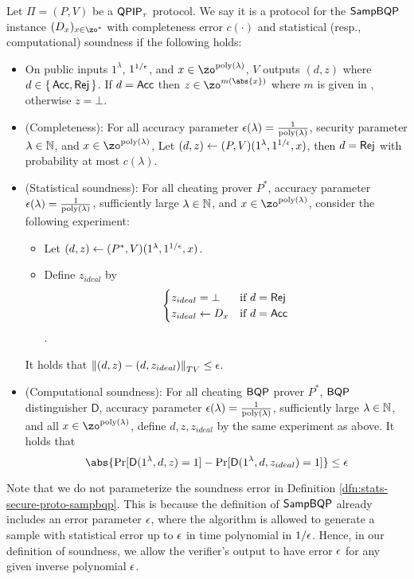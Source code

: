\begin{definition}
	\label{dfn:stats-secure-proto-sampbqp}
	Let $\Pi=(P, V)$ be a $\operatorname{\mathsf{QPIP}}_\tau$ protocol.
	We say it is a protocol for the $\operatorname{\mathsf{SampBQP}}$ instance $(D_x)_{x\in\zo^*}$ with completeness error $c(\cdot)$ and statistical (resp., computational) soundness if the following holds:
	\begin{itemize}
		\item On public inputs $1^\lambda$, $1^{1/\epsilon}$, and $x\in\zo^{\poly(\lambda)}$, $V$ outputs $(d, z)$ where $d\in\set{\mathsf{Acc}, \mathsf{Rej}}$.
			If $d=\mathsf{Acc}$ then $z\in\zo^{m(\abs{x})}$ where $m$ is given in , otherwise $z=\bot$.
		\item (Completeness):
			For all accuracy parameter $\epsilon(\lambda)=\frac{1}{\operatorname*{\operatorname{poly}}(\lambda)}$,
			security parameter $\lambda\in\mathbb{N}$,
			and $x\in\zo^{\poly(\lambda)}$, 
			Let $(d, z)\leftarrow(P, V)(1^\lambda, 1^{1/\epsilon}, x)$, then $d=\mathsf{Rej}$ with probability at most $c(\lambda)$.
		\item (Statistical soundness): For all cheating prover $P^*$,
		    accuracy parameter $\epsilon(\lambda)=\frac{1}{\operatorname*{\operatorname{poly}}(\lambda)}$,
			sufficiently large $\lambda\in\mathbb{N}$, and $x\in\zo^{\poly(\lambda)}$, 
			consider the following experiment:
			\begin{itemize}
				\item Let $(d, z)\leftarrow(P^*, V)(1^\lambda, 1^{1/\epsilon}, x)$.
				\item Define $z_{ideal}$ by
				$$\begin{cases}
					z_{ideal}=\bot & \text{if } d=\mathsf{Rej}\\
					z_{ideal}\leftarrow D_x & \text{if } d=\mathsf{Acc}
				\end{cases}$$.
			\end{itemize}
			It holds that $\left\lVert(d,z)-(d,z_{ideal})\right\rVert_{TV}\leq\epsilon$. 
		\item (Computational soundness):
		For all cheating $\operatorname{\mathsf{BQP}}$ prover $P^*$, $\operatorname{\mathsf{BQP}}$ distinguisher $\mathsf{D}$, accuracy parameter $\epsilon(\lambda)=\frac{1}{\operatorname*{\operatorname{poly}}(\lambda)}$,
			sufficiently large $\lambda\in\mathbb{N}$, and all $x\in\zo^{\poly(\lambda)}$, 
			define $d, z, z_{ideal}$ by the same experiment as above.
			It holds that
			$$\abs{\Pr[\mathsf{D}(1^{\lambda}, d,z) = 1] - \Pr[\mathsf{D}(1^{\lambda}, d,z_{ideal}) = 1]} \leq \eps $$
	\end{itemize}
\end{definition}

\begin{remark} Note that we do not parameterize the soundness error in Definition \ref{dfn:stats-secure-proto-sampbqp}. This is because the definition of $\operatorname{\mathsf{SampBQP}}$ already includes an error parameter $\epsilon$, where the algorithm is allowed to generate a sample with statistical error up to $\epsilon$ in time polynomial in $1/\epsilon$. Hence, in our definition of soundness, we allow the verifier's output to have error $\epsilon$ for any given inverse polynomial $\epsilon$. 
\end{remark}

